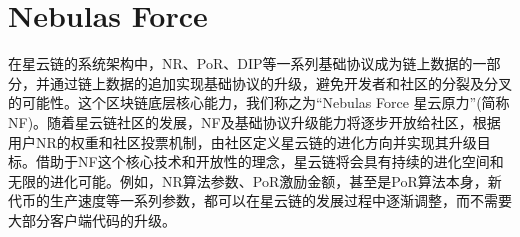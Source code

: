 \section{Nebulas Force }
在星云链的系统架构中，NR、PoR、DIP等一系列基础协议成为链上数据的一部分，并通过链上数据的追加实现基础协议的升级，避免开发者和社区的分裂及分叉的可能性。这个区块链底层核心能力，我们称之为“Nebulas Force 星云原力”(简称NF)。随着星云链社区的发展，NF及基础协议升级能力将逐步开放给社区，根据用户NR的权重和社区投票机制，由社区定义星云链的进化方向并实现其升级目标。借助于NF这个核心技术和开放性的理念，星云链将会具有持续的进化空间和无限的进化可能。例如，NR算法参数、PoR激励金额，甚至是PoR算法本身，新代币的生产速度等一系列参数，都可以在星云链的发展过程中逐渐调整，而不需要大部分客户端代码的升级。